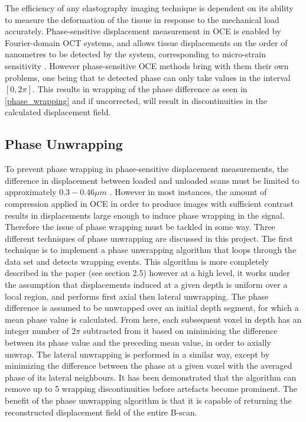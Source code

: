 The efficiency of any elastography imaging technique is dependent on its ability to measure the deformation of the tissue in response to the mechanical load accurately. Phase-sensitive displacement measurement in OCE is enabled by Fourier-domain OCT systems, and allows tissue displacements on the order of nanometres to be detected by the system, corresponding to micro-strain sensitivity \cite{kennedy_review_2014}. However phase-sensitive OCE methods bring with them their own problems, one being that te detected phase can only take values in the interval $[0,2\pi]$. This results in wrapping of the phase difference as seen in \autoref{phase_wrapping} and if uncorrected, will result in discontinuities in the calculated displacement field.

\subsection{Phase Unwrapping}
To prevent phase wrapping in phase-sensitive displacement measurements, the difference in displacement between loaded and unloaded scans must be limited to approximately $0.3-0.46\mu m$ \cite{kennedy_optical_2014}. However in most instances, the amount of compression applied in OCE in order to produce images with sufficient contrast results in displacements large enough to induce phase wrapping in the signal. Therefore the issue of phase wrapping must be tackled in some way. Three different techniques of phase unwrapping are discussed in this project. The first technique is to implement a phase unwrapping algorithm that loops through the data set and detects wrapping events. This algorithm is more completely described in the paper \cite{kennedy_optical_2014} (see section 2.5) however at a high level, it works under the assumption that displacements induced at a given depth is uniform over a local region, and performs first axial then lateral unwrapping. The phase difference is assumed to be unwrapped over an initial depth segment, for which a mean phase value is calculated. From here, each subsequent voxel in depth has an integer number of $2\pi$ subtracted from it based on minimising the difference between its phase value and the preceding mean value, in order to axially unwrap. The lateral unwrapping is performed in a similar way, except by minimizing the difference between the phase at a given voxel with the averaged phase of its lateral neighbours. It has been demonstrated that the algorithm can remove up to 5 wrapping discontinuities \cite{kennedy_optical_2014} before artefacts become prominent.
The benefit of the phase unwrapping algorithm is that it is capable of returning the reconstructed displacement field of the entire B-scan. 

